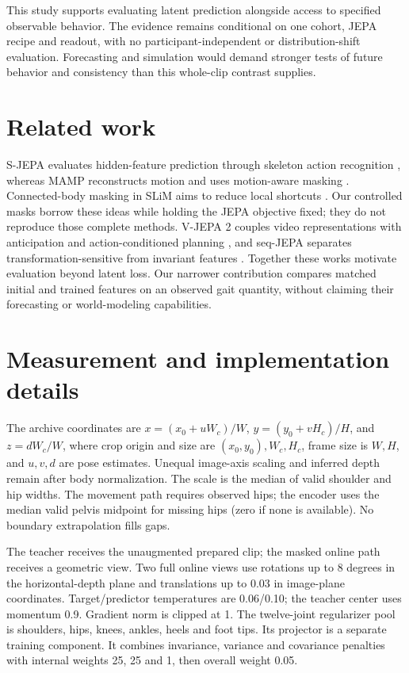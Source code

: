 \documentclass{article}
\begin{document}
This study supports evaluating latent prediction alongside access to
specified observable behavior. The evidence remains conditional on one
cohort, JEPA recipe and readout, with no participant-independent or
distribution-shift evaluation. Forecasting and simulation would demand
stronger tests of future behavior and consistency than this whole-clip
contrast supplies.

\section{Related work}\label{related-work}

S-JEPA evaluates hidden-feature prediction through skeleton action
recognition \citep{sjepa}, whereas MAMP reconstructs motion and uses
motion-aware masking \citep{mamp}. Connected-body masking in SLiM aims
to reduce local shortcuts \citep{slim}. Our controlled masks borrow
these ideas while holding the JEPA objective fixed; they do not
reproduce those complete methods. V-JEPA 2 couples video representations
with anticipation and action-conditioned planning \citep{vjepa2}, and
seq-JEPA separates transformation-sensitive from invariant features
\citep{seqjepa}. Together these works motivate evaluation beyond latent
loss. Our narrower contribution compares matched initial and trained
features on an observed gait quantity, without claiming their
forecasting or world-modeling capabilities.

\clearpage


\clearpage
\appendix
\section{Measurement and implementation
details}\label{measurement-and-implementation-details}

The archive coordinates are \(x=(x_0+uW_c)/W\), \(y=(y_0+vH_c)/H\), and
\(z=dW_c/W\), where crop origin and size are \((x_0,y_0),W_c,H_c\),
frame size is \(W,H\), and \(u,v,d\) are pose estimates. Unequal
image-axis scaling and inferred depth remain after body normalization.
The scale is the median of valid shoulder and hip widths. The movement
path requires observed hips; the encoder uses the median valid pelvis
midpoint for missing hips (zero if none is available). No boundary
extrapolation fills gaps.

The teacher receives the unaugmented prepared clip; the masked online
path receives a geometric view. Two full online views use rotations up
to 8 degrees in the horizontal-depth plane and translations up to 0.03
in image-plane coordinates. Target/predictor temperatures are 0.06/0.10;
the teacher center uses momentum 0.9. Gradient norm is clipped at 1. The
twelve-joint regularizer pool is shoulders, hips, knees, ankles, heels
and foot tips. Its projector is a separate training component. It
combines invariance, variance and covariance penalties with internal
weights 25, 25 and 1, then overall weight 0.05.
\end{document}
